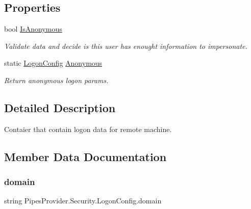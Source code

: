 \subsection*{Properties}
\begin{DoxyCompactItemize}
\item 
bool \mbox{\hyperlink{struct_pipes_provider_1_1_security_1_1_logon_config_a75522f37bf91bbd20f01fa4498d28dd1}{Is\+Anonymous}}
\begin{DoxyCompactList}\small\item\em Validate data and decide is this user has enought information to impersonate. \end{DoxyCompactList}\item 
static \mbox{\hyperlink{struct_pipes_provider_1_1_security_1_1_logon_config}{Logon\+Config}} \mbox{\hyperlink{struct_pipes_provider_1_1_security_1_1_logon_config_ad09f6e3c892826dc5df995e02f7a5738}{Anonymous}}
\begin{DoxyCompactList}\small\item\em Return anonymous logon params. \end{DoxyCompactList}\end{DoxyCompactItemize}


\subsection{Detailed Description}
Contaier that contain logon data for remote machine. 



\subsection{Member Data Documentation}
\mbox{\label{struct_pipes_provider_1_1_security_1_1_logon_config_a65f053075525de0b032d76a1ac733059}} 
\subsubsection{\texorpdfstring{domain}{domain}}
{\footnotesize\ttfamily string Pipes\+Provider.\+Security.\+Logon\+Config.\+domain}



